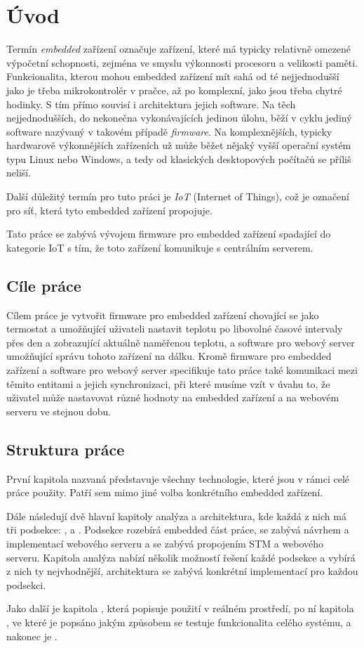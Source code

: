 \chapter*{Úvod}

Termín \emph{embedded} zařízení označuje zařízení, které má typicky relativně omezené výpočetní schopnosti,
zejména ve smyslu výkonnosti procesoru a velikosti paměti.
Funkcionalita, kterou mohou embedded zařízení mít sahá od té nejjednodušší jako je třeba mikrokontrolér
v pračce, až po komplexní, jako jsou třeba chytré hodinky.
S tím přímo souvisí i architektura jejich software.
Na těch nejjednodušších, do nekonečna vykonávajících jedinou úlohu, běží v cyklu jediný software
nazývaný v takovém případě \emph{firmware}.
Na komplexnějších, typicky hardwarově výkonnějších zařízeních už může běžet nějaký vyšší operační systém
typu Linux nebo Windows, a tedy od klasických desktopových počítačů se příliš neliší.

Další důležitý termín pro tuto práci je \emph{IoT} (Internet of Things), což je označení pro síť,
která tyto embedded zařízení propojuje.

Tato práce se zabývá vývojem firmware pro embedded zařízení spadající do kategorie IoT s tím,
že toto zařízení komunikuje s centrálním serverem.


\section{Cíle práce}
Cílem práce je vytvořit firmware pro embedded zařízení chovající se jako termostat a umožňující
uživateli nastavit teplotu po libovolné časové intervaly přes den a zobrazující aktuálně naměřenou
teplotu, a software pro webový server umožňující správu tohoto zařízení na dálku.
Kromě firmware pro embedded zařízení a software pro webový server specifikuje tato práce také
komunikaci mezi těmito entitami a jejich synchronizaci, při které musíme vzít v úvahu to, že uživatel
může nastavovat různé hodnoty na embedded zařízení a na webovém serveru ve stejnou dobu.

\section{Struktura práce}
První kapitola nazvaná  představuje všechny technologie, které jsou v rámci celé práce
použity.
Patří sem mimo jiné volba konkrétního embedded zařízení.

Dále následují dvě hlavní kapitoly analýza a architektura, kde každá z nich má tři podsekce: ,
 a .
Podsekce  rozebírá embedded část práce,  se zabývá návrhem a implementací webového serveru
a  se zabývá propojením STM a webového serveru.
Kapitola analýza nabízí několik možností řešení každé podsekce a vybírá z nich ty nejvhodnější,
architektura se zabývá konkrétní implementací pro každou podsekci.

Jako další je kapitola , která popisuje použití v reálném prostředí, po ní kapitola
, ve které je popsáno jakým způsobem se testuje funkcionalita celého systému, a nakonec
je .
